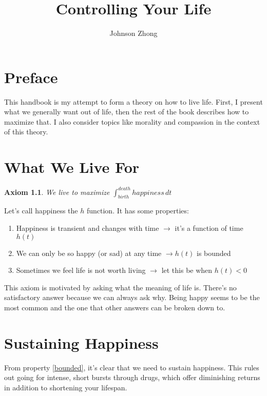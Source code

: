 \documentclass{report}
\newtheorem*{axiom}{Axiom}
\begin{document}
\title{Controlling Your Life}
\author{Johnson Zhong}

\maketitle

\chapter*{Preface}

This handbook is my attempt to form a theory on how to live life.
First, I present what we generally want out of life, then the rest of the book
describes how to maximize that. I also consider topics like morality
and compassion in the context of this theory.

\chapter{What We Live For}
\begin{axiom}
	We live to maximize $\int_{birth}^{death} happiness \, dt$
\end{axiom}

Let's call happiness the $h$ function. It has some properties:
\begin{enumerate}[label=H\arabic*]
	\item Happiness is transient and changes with time $\rightarrow$ it's
	a function of time $h(t)$
	\item \label{bounded} We can only be so happy (or sad) at any time $\rightarrow h(t)$ is bounded
	\item \label{positive} Sometimes we feel life is not worth living $\rightarrow$ let this be when $h(t) < 0$
\end{enumerate}  

This axiom is motivated by asking what the meaning of life is.
There's no satisfactory answer because we can always ask why.
Being happy seems to be the most common and the one that
other answers can be broken down to.

\chapter{Sustaining Happiness}
From property \ref{bounded}, it's clear that we need to sustain happiness. 
This rules out going for intense, short bursts through drugs, 
which offer diminishing returns in addition to shortening your lifespan. 
\end{document}
